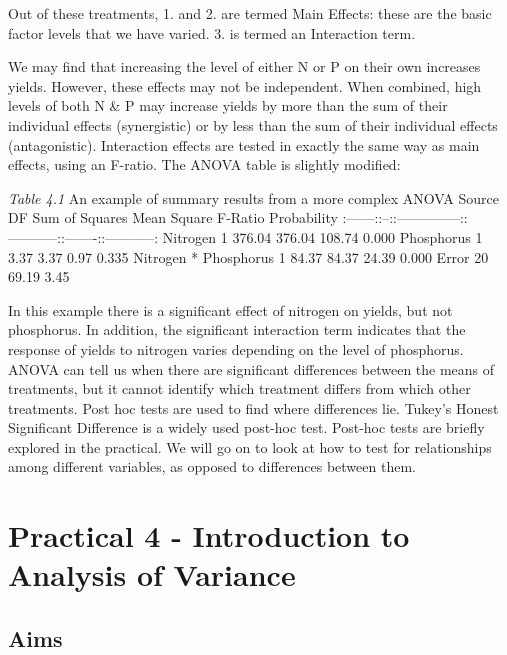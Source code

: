 \documentclass[
]{book}
\begin{document}
Out of these treatments, 1. and 2. are termed Main Effects: these are the basic factor levels that we have varied. 3. is termed an Interaction term.

We may find that increasing the level of either N or P on their own increases yields. However, these effects may not be independent. When combined, high levels of both N \& P may increase yields by more than the sum of their individual effects (synergistic) or by less than the sum of their individual effects (antagonistic). Interaction effects are tested in exactly the same way as main effects, using an F-ratio. The ANOVA table is slightly modified:

\emph{Table 4.1} An example of summary results from a more complex ANOVA
\textbar{} Source \textbar{} DF \textbar{} Sum of Squares \textbar{} Mean Square \textbar{} F-Ratio \textbar{} Probability \textbar{}
\textbar:------:\textbar:--:\textbar:--------------:\textbar:-----------:\textbar:-------:\textbar:-----------:\textbar{}
\textbar{} Nitrogen \textbar{} 1 \textbar{} 376.04 \textbar{} 376.04 \textbar{} 108.74 \textbar{} 0.000 \textbar{}
\textbar{} Phosphorus \textbar{} 1 \textbar{} 3.37 \textbar{} 3.37 \textbar{} 0.97 \textbar{} 0.335 \textbar{}
\textbar{} Nitrogen * Phosphorus \textbar{} 1 \textbar{} 84.37 \textbar{} 84.37 \textbar{} 24.39 \textbar{} 0.000 \textbar{}
\textbar{} Error \textbar{} 20 \textbar{} 69.19 \textbar{} 3.45 \textbar{}

In this example there is a significant effect of nitrogen on yields, but not phosphorus. In addition, the significant interaction term indicates that the response of yields to nitrogen varies depending on the level of phosphorus. ANOVA can tell us when there are significant differences between the means of treatments, but it cannot identify which treatment differs from which other treatments. Post hoc tests are used to find where differences lie. Tukey's Honest Significant Difference is a widely used post-hoc test. Post-hoc tests are briefly explored in the practical. We will go on to look at how to test for relationships among different variables, as opposed to differences between them.

\section{Practical 4 - Introduction to Analysis of Variance}\label{practical-4---introduction-to-analysis-of-variance}

\subsection{Aims}\label{aims}
\end{document}
